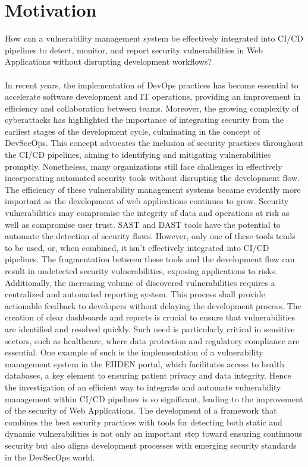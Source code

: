 \section{Motivation}
How can a vulnerability management system be effectively integrated into CI/CD pipelines to detect, monitor, and report security vulnerabilities in Web Applications without disrupting development workflows?
\paragraph{}

In recent years, the implementation of DevOps practices has become essential to accelerate software development and IT operations, providing an improvement in efficiency and collaboration between teams. Moreover, the growing complexity of cyberattacks has highlighted the importance of integrating security from the earliest stages of the development cycle, culminating in the concept of DevSecOps. This concept advocates the inclusion of security practices throughout the CI/CD pipelines, aiming to identifying and mitigating vulnerabilities promptly. Nonetheless, many organizations still face challenges in effectively incorporating automated security tools without disrupting the development flow.
The efficiency of these vulnerability management systems became evidently more important as the development of web applications continues to grow. Security vulnerabilities may compromise the integrity of data and operations at risk as well as compromise user trust. SAST and DAST tools have the potential to automate the detection of security flaws. However, only one of these tools tends to be used, or, when combined, it isn’t effectively integrated into CI/CD pipelines. The fragmentation between these tools and the development flow can result in undetected security vulnerabilities, exposing applications to risks.
Additionally, the increasing volume of discovered vulnerabilities requires a centralized and automated reporting system. This process shall provide actionable feedback to developers without delaying the development process. The creation of clear dashboards and reports is crucial to ensure that vulnerabilities are identified and resolved quickly. Such need is particularly critical in sensitive sectors, such as healthcare, where data protection and regulatory compliance are essential. One example of such is the implementation of a vulnerability management system in the EHDEN portal, which facilitates access to health databases, a key element to ensuring patient privacy and data integrity. 
Hence the investigation of an efficient way to integrate and automate vulnerability management within CI/CD pipelines is so significant, leading to the improvement of the security of Web Applications. The development of a framework that combines the best security practices with tools for detecting both static and dynamic vulnerabilities is not only an important step toward ensuring continuous security but also aligns development processes with emerging security standards in the DevSecOps world.
